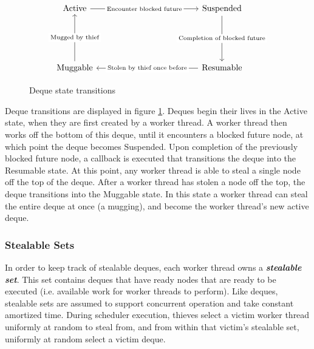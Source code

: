 \documentclass[bsc,frontabs,singlespacing,parskip,deptreport,normalheadings]{infthesis}
\begin{document}
\begin{figure}[ht]
\[\begin{tikzcd}
	{\text{Active}} &&&&& {\text{Suspended}} \\
	\\
	\\
	{\text{Muggable}} &&&&& {\text{Resumable}}
	\arrow["{\text{Encounter blocked future}}"{description}, from=1-1, to=1-6]
	\arrow["{\text{Completion of blocked future}}"{description}, from=1-6, to=4-6]
	\arrow["{\text{Stolen by thief once before}}"{description}, from=4-6, to=4-1]
	\arrow["{\text{Mugged by thief}}"{description}, from=4-1, to=1-1]
\end{tikzcd}\]
\caption{Deque state transitions}
\label{figure:deque_state_transitions}
\end{figure}

Deque transitions are displayed in figure \ref{figure:deque_state_transitions}.
Deques begin their lives in the Active state, when they are first created by a
worker thread. A worker thread then works off the bottom of this deque, until it
encounters a blocked future node, at which point the deque becomes Suspended.
Upon completion of the previously blocked future node, a callback is executed
that transitions the deque into the Resumable state. At this point, any worker
thread is able to steal a single node off the top of the deque. After a worker
thread has stolen a node off the top, the deque transitions into the Muggable
state. In this state a worker thread can steal the entire deque at once (a
mugging), and become the worker thread's new active deque.

\subsubsection*{Stealable Sets}

In order to keep track of stealable deques, each worker thread owns a
\textbf{\textit{stealable set}}. This set contains deques that have ready nodes
that are ready to be executed (i.e. available work for worker threads to
perform). Like deques, stealable sets are assumed to support concurrent
operation and take constant amortized time. During scheduler execution, thieves
select a victim worker thread uniformly at random to steal from, and from within
that victim's stealable set, uniformly at random select a victim deque.
\end{document}
